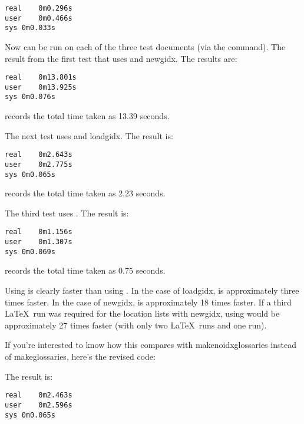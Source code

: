 \begin{verbatim}
real	0m0.296s
user	0m0.466s
sys	0m0.033s
\end{verbatim}

   Now  can be run on each of the three test documents 
   (via the  command). The result from the first test
   that uses  and \gls{newgidx}. The results are:

\begin{verbatim}
real	0m13.801s
user	0m13.925s
sys	0m0.076s
\end{verbatim}

   records the total time taken as 13.39 seconds.


  The next test uses  and \gls{loadgidx}. 
  The result is:

\begin{verbatim}
real	0m2.643s
user	0m2.775s
sys	0m0.065s
\end{verbatim}

   records the total time taken as 2.23 seconds.


  The third test uses . The result is:

\begin{verbatim}
real	0m1.156s
user	0m1.307s
sys	0m0.069s
\end{verbatim}

   records the total time taken as 0.75 seconds.


   Using  is clearly faster than using
   . In the case of \gls{loadgidx},
    is approximately three times faster. In the 
   case of \gls{newgidx},  is approximately 
  18 times faster. If a third \LaTeX\ run was required
  for the location lists with \gls{newgidx}, using  would be approximately 
  27 times faster (with only two \LaTeX\ runs and one  run).


   If you're interested to know how this compares with \gls{makenoidxglossaries} instead of \gls{makeglossaries}, here's the revised 
    code:



   The result is:

\begin{verbatim}
real	0m2.463s
user	0m2.596s
sys	0m0.065s
\end{verbatim}

